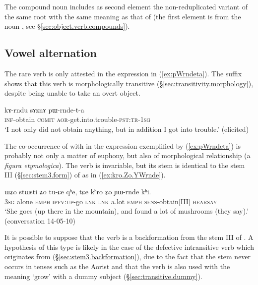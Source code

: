 The compound noun  includes as second element the non-redupli\-ca\-ted variant of the same root  with the same meaning as that of  (the first element is from the noun , see §\ref{sec:object.verb.compounds}).

\subsection{Vowel alternation} \label{sec:pWrndeta}
The rare verb  is only attested in the expression in (\ref{ex:pWrndeta}). The  suffix shows that this verb is morphologically transitive (§\ref{sec:transitivity.morphology}), despite being unable to take an overt object. 

\begin{exe}
\ex \label{ex:pWrndeta}
\gll kɤ-rndu sɤznɤ pɯ-rnde-t-a  \\
\textsc{inf}-obtain \textsc{comit} \textsc{aor}-get.into.trouble-\textsc{pst}:\textsc{tr}-\textsc{1sg} \\
\glt `I not only did not obtain anything, but in addition I got into trouble.' (elicited)
\end{exe}

The co-occurrence of  with  in the expression exemplified by (\ref{ex:pWrndeta}) is probably not only a matter of euphony, but also of morphological relationship (a \textit{figura etymologica}). The verb  is invariable, but its stem is identical to the stem III (§\ref{sec:stem3.form}) of  as in (\ref{ex:kro.Zo.YWrnde}). 

\begin{exe}
\ex \label{ex:kro.Zo.YWrnde}
\gll ɯʑo stɯsti ʑo tu-ɕe qʰe, tɕe kʰro ʑo ɲɯ-rnde kʰi. \\
\textsc{3sg} alone \textsc{emph} \textsc{ipfv}:\textsc{up}-go \textsc{lnk} \textsc{lnk} a.lot \textsc{emph} \textsc{sens}-obtain[III] \textsc{hearsay} \\
\glt `She goes (up there in the mountain), and found a lot of mushrooms (they say).' (conversation 14-05-10)
\end{exe}

It is possible to suppose that the verb  is a backformation from the stem III of . A hypothesis of this type is likely in the case of the defective intransitive verb  which originates from  (§\ref{sec:stem3.backformation}), due to the fact that the stem  never occurs in tenses such as the Aorist and that the verb  is also used with the meaning `grow' with a dummy subject (§\ref{sec:transitive.dummy}).

